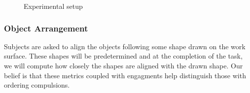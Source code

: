 \documentclass[11pt]{article}
\begin{document}
\begin{figure}%
    \centering
    \qquad
    \caption{Experimental setup}%
    \label{setup}%
\end{figure}
\subsubsection{Object Arrangement}
Subjects are asked to align the objects following some shape drawn on the work surface. These shapes will be predetermined and at the completion of the task, we will compute how closely the shapes are aligned with the drawn shape. Our belief is that these metrics coupled with engagments help distinguish those with ordering compulsions.
\end{document}
